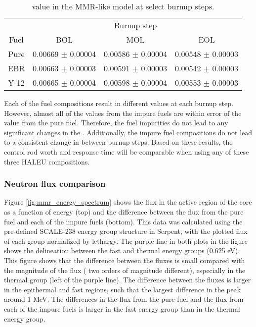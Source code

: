 \begin{table}[ht]
        \centering
        \caption{\betaEff value in the \gls{MMR}-like model at 
        select burnup steps.}
        \label{tab:mmr_betaeff}
        \begin{tabular}{c c c c}
                \hline 
                 & \multicolumn{3}{c}{Burnup step}\\
                Fuel & \gls{BOL} & \gls{MOL} & \gls{EOL}\\
                \hline 
                Pure & 0.00669 $\pm$ 0.00004 & 0.00586 $\pm$ 0.00004 & 0.00548 $\pm$ 0.00003\\
                \gls{EBR} & 0.00663 $\pm$ 0.00003 & 0.00591 $\pm$ 0.00003 & 0.00542 $\pm$ 0.00003\\
                Y-12 & 0.00665 $\pm$ 0.00004 &  0.00598 $\pm$ 0.00004& 0.00553 $\pm$ 0.00003\\
                \hline 

        \end{tabular}
\end{table}

Each of the fuel compositions result in different \betaEff values at 
each burnup step. However, almost all of the values from the impure 
fuels are within error of the value from the pure fuel. Therefore, the 
fuel impurities do not lead to any significant changes in the 
\betaEff. Additionally, the impure fuel compositions do not lead to 
a consistent change in \betaEff between burnup steps. Based on 
these results, the control rod worth and response time will be 
comparable when using any of these three \gls{HALEU} compositions.

\subsubsection{Neutron flux comparison}
Figure \ref{fig:mmr_energy_spectrum} shows the flux in the active 
region of the core as a function of energy (top) and the difference between 
the flux from the pure fuel and each of the impure fuels (bottom). This 
data was 
calculated using the pre-defined SCALE-238 energy group structure in Serpent,
with the plotted flux of each group normalized by lethargy. The purple 
line in both plots in the figure shows the delineation between the fast and 
thermal energy groups (0.625 eV). This figure shows that the difference between 
the fluxes is small compared with the magnitude of the flux ( two orders 
of magnitude different), especially in 
the thermal group (left of the purple line). The difference between the 
fluxes is larger in the epithermal and fast regions, such that the largest 
difference in the peak around 1 MeV. The differences 
in the flux from the pure fuel and the flux from each of the impure 
fuels is larger in the fast energy group than in the thermal energy group.

